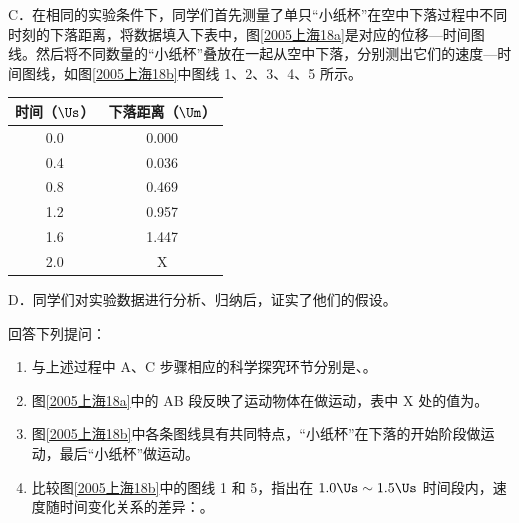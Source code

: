 \documentclass[\gkver]{gaokaozhenti}
\begin{document}
\begin{enumerate}
C．在相同的实验条件下，同学们首先测量了单只“小纸杯”在空中下落过程中不同时刻的下落距离，将数据填入下表中，图\ref{2005上海18a}是对应的位移—时间图线。然后将不同数量的“小纸杯”叠放在一起从空中下落，分别测出它们的速度—时间图线，如图\ref{2005上海18b}中图线 1、2、3、4、5 所示。

\begin{center}
\begin{tabular}{|c|c|}
\hline
时间（$\Us$） & 下落距离（$\Um$） \\ \hline
0.0 & 0.000 \\ \hline
0.4 & 0.036 \\ \hline
0.8 & 0.469 \\ \hline
1.2 & 0.957 \\ \hline
1.6 & 1.447 \\ \hline
2.0 & X \\ \hline
\end{tabular}
\end{center}

D．同学们对实验数据进行分析、归纳后，证实了他们的假设。

回答下列提问：

\begin{enumerate}
	\item
	与上述过程中 A、C 步骤相应的科学探究环节分别是、。
	\item
	图\ref{2005上海18a}中的 AB 段反映了运动物体在做运动，表中 X 处的值为。
	\item
	图\ref{2005上海18b}中各条图线具有共同特点，“小纸杯”在下落的开始阶段做运动，最后“小纸杯”做运动。
	\item
	比较图\ref{2005上海18b}中的图线 1 和 5，指出在 $1.0\Us\sim1.5\Us$ 时间段内，速度随时间变化关系的差异：。
\end{enumerate}


\end{enumerate}
\end{document}

